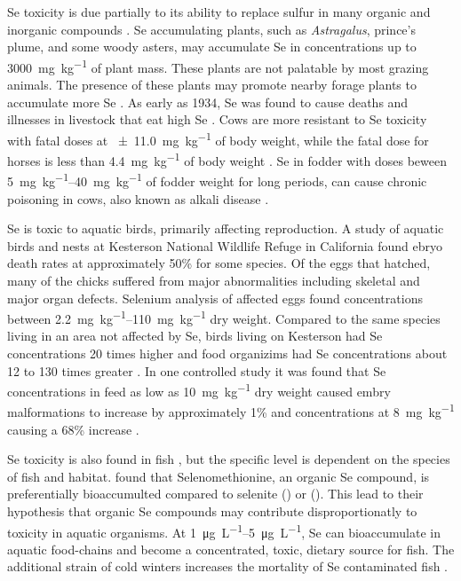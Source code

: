 \begin{linenumbers}[1]
Se toxicity is due partially to its ability to replace sulfur in many organic and inorganic compounds \citep{Besser1989}.  Se accumulating plants, such as \textit{Astragalus}, prince's plume, and some woody asters, may accumulate Se in concentrations up to \SI{3000}{\milli\gram\per\kilo\gram} of plant mass.  These plants are not palatable by most grazing animals.  The presence of these plants may promote nearby forage plants to accumulate more Se \citep{2006USDA}.  As early as 1934, Se was found to cause deaths and illnesses in livestock that eat high Se \citep{scott1973,Rohwer1931,Besser1989,2006USDA}.  Cows are more resistant to Se toxicity with fatal doses at \SI{\pm11.0}{\milli\gram\per\kilo\gram} of body weight, while the fatal dose for horses is less than \SI{4.4}{\milli\gram\per\kilo\gram} of body weight \citep{Painter1940}.  Se in fodder with doses beween \SIrange{5}{40}{\milli\gram\per\kilo\gram} of fodder weight for long periods, can cause chronic poisoning in cows, also known as alkali disease \citep{2006USDA}.

Se is toxic to aquatic birds, primarily affecting reproduction.  A study of aquatic birds and nests at Kesterson National Wildlife Refuge in California found ebryo death rates at approximately 50\% for some species.  Of the eggs that hatched, many of the chicks suffered from major abnormalities including skeletal and major organ defects.  Selenium analysis of affected eggs found concentrations between \SIrange{2.2}{110}{\milli\gram\per\kilo\gram} dry weight.  Compared to the same species living in an area not affected by Se, birds living on Kesterson had Se concentrations 20 times higher and food organizims had Se concentrations about 12 to 130 times greater \citep{Ohlendorf1986}.  In one controlled study it was found that Se concentrations in feed as low as \SI{10}{\milli\gram\per\kilo\gram} dry weight caused embry malformations to increase by approximately 1\% and concentrations at  \SI{8}{\milli\gram\per\kilo\gram} causing a 68\% increase \citep{2002Spallholz}.

Se toxicity is also found in fish \citep{gillespie1986,Lemly1988}, but the specific level is dependent on the species of fish and habitat.  \citet{Besser1989} found that Selenomethionine, an organic Se compound, is preferentially bioaccumulted compared to selenite (\selenite) or  (\selenate).  This lead to their hypothesis that organic Se compounds may contribute disproportionatly to toxicity in aquatic organisms.  At \SIrange{1}{5}{\micro\gram\per\liter}, Se can bioaccumulate in aquatic food-chains and become a concentrated, toxic, dietary source for fish.  The additional strain of cold winters increases the mortality of Se contaminated fish \citep{Lemly1993}.  


\end{linenumbers}
